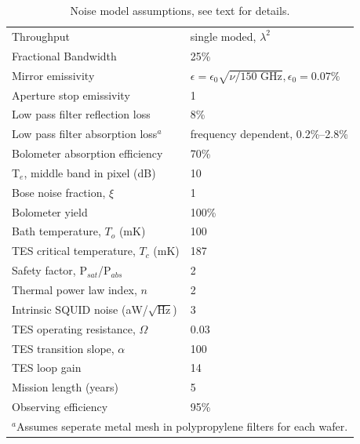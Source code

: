 \documentclass[]{spie}  %
\newcommand{\comr}[1]{\textcolor{red}{#1}}
\begin{document}
\begin{table}[ht]
\centering
\caption{Noise model assumptions, see text for details. }%
\label{tab:assume}
%
\begin{tabular}{|l|l|}
\hline
Throughput                       & single moded, $\lambda^2$          \\
Fractional Bandwidth             & 25\%                                             \\
Mirror emissivity                & $\epsilon = \epsilon_0\sqrt{\nu/\text{150~GHz}}, \epsilon_0 = 0.07\%$ \\
Aperture stop emissivity         & 1                                                \\
Low pass filter reflection loss  & 8\%                                                \\
Low pass filter absorption loss$^a$  & frequency dependent, 0.2\%--2.8\%             \\
Bolometer absorption efficiency  & 70\%                                             \\
T$_e$, middle band in pixel (dB) & 10                                               \\
Bose noise fraction, $\xi$       & 1                                                \\
Bolometer yield                 & 100\%                                            \\
Bath temperature, $T_o$ (mK)    & 100                                              \\
TES critical temperature, $T_c$ (mK)   & 187                                              \\
Safety factor, P$_{sat}$/P$_{abs}$      & 2                                                \\
Thermal power law index, $n$    & 2                                                \\
Intrinsic SQUID noise (aW/$\sqrt{\text{Hz}}$)   & 3                        \\
TES operating resistance, $\Omega$    &  0.03                               \\
TES transition slope, $\alpha$    & 100                                         \\
TES loop gain                    & 14                                \\
Mission length (years)           & 5                                                \\
Observing efficiency             & 95\%                                             \\
\hline
\multicolumn{2}{l}{\footnotesize $^a$Assumes seperate metal mesh in polypropylene filters for each wafer.}
\end{tabular}
\end{table}
\end{document}
